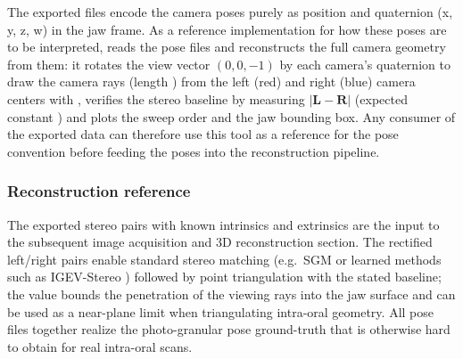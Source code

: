 The exported  files encode the camera poses purely as position and quaternion (x, y, z, w) in the jaw frame. As a reference
implementation for how these poses are to be interpreted,  reads the pose files and reconstructs the full camera geometry from
them: it rotates the view vector $(0,0,-1)$ by each camera's quaternion to draw the camera rays (length ) from the left (red)
and right (blue) camera centers with , verifies the stereo baseline by measuring $\lvert \mathbf{L}-\mathbf{R}\rvert$ (expected
constant ) and plots the sweep order and the jaw bounding box. Any consumer of the exported data can therefore use this tool as a
reference for the pose convention before feeding the poses into the reconstruction pipeline.

\subsubsection{Reconstruction reference}\label{ms:reconstruction}

The exported stereo pairs with known intrinsics and extrinsics are the input to the subsequent image acquisition and 3D reconstruction section. The
rectified left/right pairs enable standard stereo matching (e.g.\ SGM \cite{hirschmuller_stereo_2008} or learned methods such as IGEV-Stereo
\cite{xu_iterative_2023}) followed by point triangulation with the stated baseline; the  value bounds the penetration of the
viewing rays into the jaw surface and can be used as a near-plane limit when triangulating intra-oral geometry. All pose files together realize the
photo-granular pose ground-truth that is otherwise hard to obtain for real intra-oral scans.
